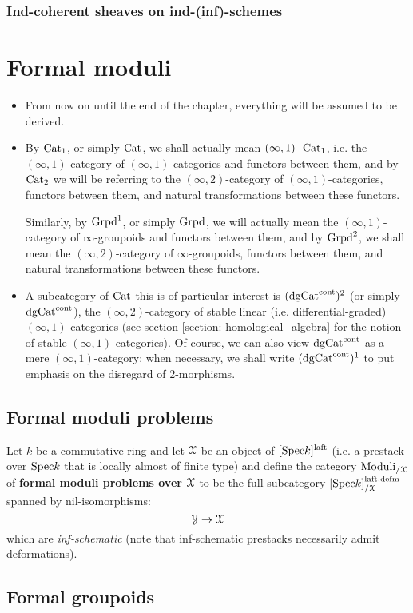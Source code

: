             \subsubsection{Ind-coherent sheaves on ind-(inf)-schemes}
        
    \section{Formal moduli}
        \begin{convention} \label{conv: moduli_everything_is_derived}
            \noindent
            \begin{itemize}
                \item From now on until the end of the chapter, everything will be assumed to be derived. 
                \item By $\mathrm{Cat}_1$, or simply $\mathrm{Cat}$, we shall actually mean $(\infty, 1)\operatorname{-}\mathrm{Cat}_1$, i.e. the $(\infty, 1)$-category of $(\infty, 1)$-categories and functors between them, and by $\mathrm{Cat}_2$ we will be referring to the $(\infty, 2)$-category of $(\infty, 1)$-categories, functors between them, and natural transformations between these functors. 
                
                Similarly, by $\mathrm{Grpd}^1$, or simply $\mathrm{Grpd}$, we will actually mean the $(\infty, 1)$-category of $\infty$-groupoids and functors between them, and by $\mathrm{Grpd}^2$, we shall mean the $(\infty, 2)$-category of $\infty$-groupoids, functors between them, and natural transformations between these functors.
                \item A subcategory of $\mathrm{Cat}$ this is of particular interest is $(\mathrm{dg}\mathrm{Cat}^{\mathrm{cont}})^2$ (or simply $\mathrm{dg}\mathrm{Cat}^{\mathrm{cont}}$), the $(\infty, 2)$-category of stable linear (i.e. differential-graded) $(\infty, 1)$-categories (see section \ref{section: homological_algebra} for the notion of stable $(\infty, 1)$-categories). Of course, we can also view $\mathrm{dg}\mathrm{Cat}^{\mathrm{cont}}$ as a mere $(\infty, 1)$-category; when necessary, we shall write $(\mathrm{dg}\mathrm{Cat}^{\mathrm{cont}})^1$ to put emphasis on the disregard of $2$-morphisms.
            \end{itemize} 
        \end{convention}
    
        \subsection{Formal moduli problems}
            \begin{definition} \label{def: formal_moduli_problems}
                Let $k$ be a commutative ring and let $\mathcal{X}$ be an object of $[\mathrm{Spec} k]^{\mathrm{laft}}$ (i.e. a prestack over $\mathrm{Spec} k$ that is locally almost of finite type) and define the category $\mathrm{Moduli}_{/\mathcal{X}}$ of \textbf{formal moduli problems over $\mathcal{X}$} to be the full subcategory $[\mathrm{Spec} k]^{\mathrm{laft}, \mathrm{defm}}_{/\mathcal{X}}$ spanned by nil-isomorphisms:
                    $$\mathcal{Y} \to \mathcal{X}$$
                which are \textit{inf-schematic} (note that inf-schematic prestacks necessarily admit deformations).
            \end{definition}
        
        \subsection{Formal groupoids}
